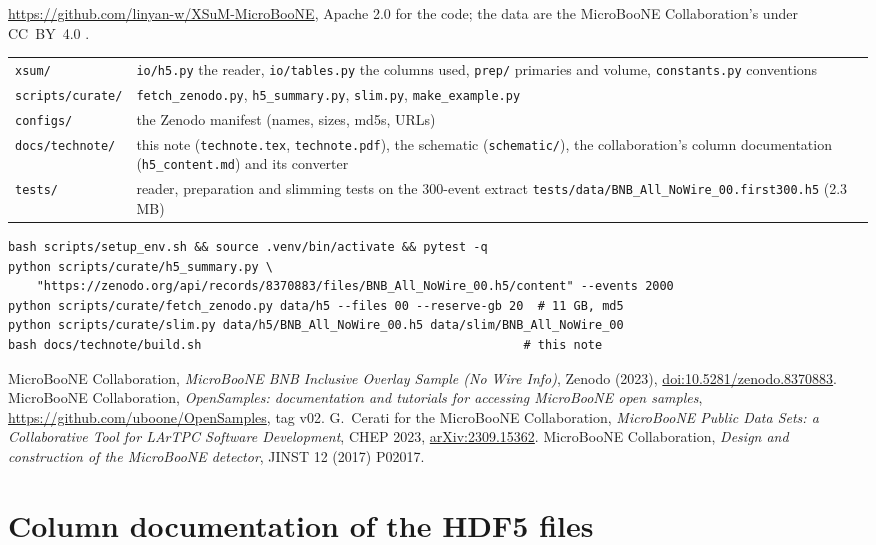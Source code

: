 \documentclass[10pt,letterpaper]{article}
\newcommand{\code}[1]{\texttt{#1}}
\begin{document}
\url{https://github.com/linyan-w/XSuM-MicroBooNE}, Apache 2.0 for the code; the data are the MicroBooNE
Collaboration's under CC~BY~4.0 \cite{zenodo8370883,microboone2017}.

\begin{table}[H]\centering\small
\begin{tabular}{@{}p{26mm}p{118mm}@{}}\toprule
\code{xsum/} & \code{io/h5.py} the reader, \code{io/tables.py} the columns used, \code{prep/} primaries and volume, \code{constants.py} conventions\\
\code{scripts/curate/} & \code{fetch\_zenodo.py}, \code{h5\_summary.py}, \code{slim.py}, \code{make\_example.py}\\
\code{configs/} & the Zenodo manifest (names, sizes, md5s, URLs)\\
\code{docs/technote/} & this note (\code{technote.tex}, \code{technote.pdf}), the schematic (\code{schematic/}), the collaboration's column documentation (\code{h5\_content.md}) and its converter\\
\code{tests/} & reader, preparation and slimming tests on the 300-event extract \code{tests/data/}\allowbreak\code{BNB\_All\_NoWire\_00.first300.h5} (2.3\,MB)\\
\bottomrule\end{tabular}
\end{table}

\begin{verbatim}
bash scripts/setup_env.sh && source .venv/bin/activate && pytest -q
python scripts/curate/h5_summary.py \
    "https://zenodo.org/api/records/8370883/files/BNB_All_NoWire_00.h5/content" --events 2000
python scripts/curate/fetch_zenodo.py data/h5 --files 00 --reserve-gb 20  # 11 GB, md5
python scripts/curate/slim.py data/h5/BNB_All_NoWire_00.h5 data/slim/BNB_All_NoWire_00
bash docs/technote/build.sh                                             # this note
\end{verbatim}

\begin{thebibliography}{9}
 MicroBooNE Collaboration, \emph{MicroBooNE BNB Inclusive Overlay Sample (No Wire Info)},
  Zenodo (2023), \href{https://doi.org/10.5281/zenodo.8370883}{doi:10.5281/zenodo.8370883}.
\bibitem{opensamples} MicroBooNE Collaboration, \emph{OpenSamples: documentation and tutorials for accessing MicroBooNE
  open samples}, \url{https://github.com/uboone/OpenSamples}, tag v02.
\bibitem{cerati2023} G.~Cerati for the MicroBooNE Collaboration, \emph{MicroBooNE Public Data Sets: a Collaborative
  Tool for LArTPC Software Development}, CHEP 2023, \href{https://arxiv.org/abs/2309.15362}{arXiv:2309.15362}.
\bibitem{microboone2017} MicroBooNE Collaboration, \emph{Design and construction of the MicroBooNE detector},
  JINST 12 (2017) P02017.
\end{thebibliography}

\clearpage
\appendix
\section{Column documentation of the HDF5 files}\label{app:content}
\footnotesize

\end{document}
